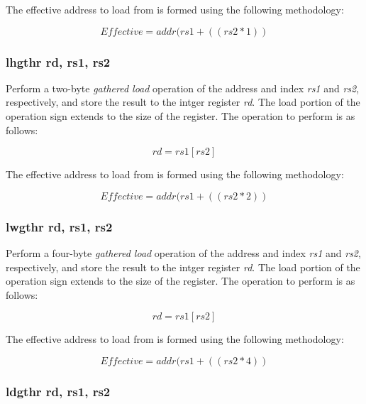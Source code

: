 \documentclass{article}
\begin{document}
The effective address to load
from is formed using the following methodology:

\begin{equation}
Effective = addr(rs1 + ((rs2 * 1))
\end{equation}


\subsubsection{lhgthr rd, rs1, rs2}

Perform a two-byte \emph{gathered load} operation of the address and
index \emph{rs1} and \emph{rs2}, respectively, and store the result
to the intger register \emph{rd}.  The load portion of the operation
sign extends to the size of the register.
The operation to perform is as follows:

\begin{equation}
rd = rs1[rs2]
\end{equation}

The effective address to load
from is formed using the following methodology:

\begin{equation}
Effective = addr(rs1 + ((rs2 * 2))
\end{equation}


\subsubsection{lwgthr rd, rs1, rs2}

Perform a four-byte \emph{gathered load} operation of the address and
index \emph{rs1} and \emph{rs2}, respectively, and store the result
to the intger register \emph{rd}.  The load portion of the operation
sign extends to the size of the register.
The operation to perform is as follows:

\begin{equation}
rd = rs1[rs2]
\end{equation}

The effective address to load
from is formed using the following methodology:

\begin{equation}
Effective = addr(rs1 + ((rs2 * 4))
\end{equation}

\subsubsection{ldgthr rd, rs1, rs2}
\end{document}
